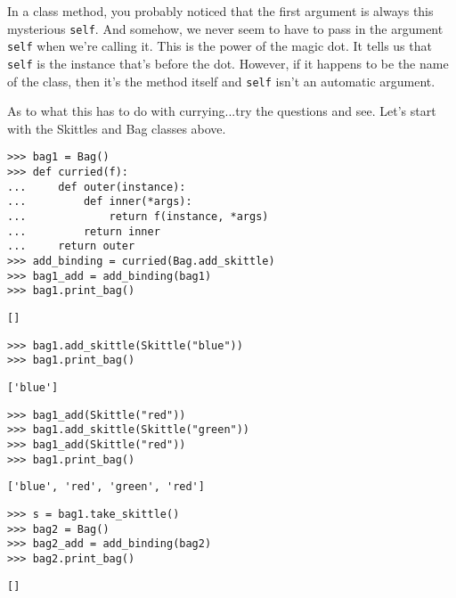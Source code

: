 In a class method, you probably noticed that the first argument is always this
mysterious \texttt{self}. And somehow, we never seem to have to pass in the
argument \texttt{self} when we're calling it. This is the power of the magic
dot. It tells us that \texttt{self} is the instance that's before the
dot. However, if it happens to be the name of the class, then it's the method
itself and \texttt{self} isn't an automatic argument.

As to what this has to do with currying...try the questions and see. Let's start
with the Skittles and Bag classes above.

\begin{lstlisting}
>>> bag1 = Bag()
>>> def curried(f):
...     def outer(instance):
...         def inner(*args):
...             return f(instance, *args)
...         return inner
...     return outer
>>> add_binding = curried(Bag.add_skittle)
>>> bag1_add = add_binding(bag1)
>>> bag1.print_bag()
\end{lstlisting}
\begin{solution}[.2in]
\begin{lstlisting}
[]
\end{lstlisting}
\end{solution}

\begin{lstlisting}
>>> bag1.add_skittle(Skittle("blue"))
>>> bag1.print_bag()
\end{lstlisting}
\begin{solution}[.2in]
\begin{lstlisting}
['blue']
\end{lstlisting}
\end{solution}

\begin{lstlisting}
>>> bag1_add(Skittle("red"))
>>> bag1.add_skittle(Skittle("green"))
>>> bag1_add(Skittle("red"))
>>> bag1.print_bag()
\end{lstlisting}
\begin{solution}[.2in]
\begin{lstlisting}
['blue', 'red', 'green', 'red']
\end{lstlisting}
\end{solution}

\begin{lstlisting}
>>> s = bag1.take_skittle()
>>> bag2 = Bag()
>>> bag2_add = add_binding(bag2)
>>> bag2.print_bag()
\end{lstlisting}
\begin{solution}[.2in]
\begin{lstlisting}
[]
\end{lstlisting}
\end{solution}

